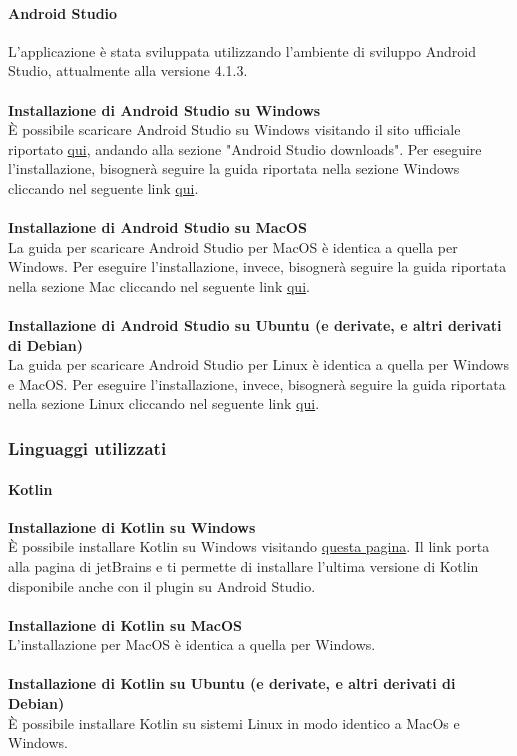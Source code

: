 \paragraph{Android Studio}
L'applicazione è stata sviluppata utilizzando l'ambiente di sviluppo Android Studio, attualmente alla versione 4.1.3.
\\
\\
\textbf{Installazione di Android Studio su Windows}
\\
È possibile scaricare Android Studio su Windows visitando il sito ufficiale riportato \href{https://developer.android.com/studio}{qui}, andando alla sezione "Android Studio downloads".
Per eseguire l'installazione, bisognerà seguire la guida riportata nella sezione Windows cliccando nel seguente link \href{https://developer.android.com/studio/install}{qui}.
\\
\\
\textbf{Installazione di Android Studio su MacOS}
\\
La guida per scaricare Android Studio per MacOS è identica a quella per Windows.
Per eseguire l'installazione, invece, bisognerà seguire la guida riportata nella sezione Mac cliccando nel seguente link \href{https://developer.android.com/studio/install}{qui}.
\\
\\
\textbf{Installazione di Android Studio su Ubuntu (e derivate, e altri derivati di Debian)}
\\
La guida per scaricare Android Studio per Linux è identica a quella per Windows e MacOS.
Per eseguire l'installazione, invece, bisognerà seguire la guida riportata nella sezione Linux cliccando nel seguente link \href{https://developer.android.com/studio/install}{qui}.
\\
\subsubsection{Linguaggi utilizzati}

\paragraph{Kotlin}
\textbf{Installazione di Kotlin su Windows}
\\
È possibile installare Kotlin su Windows visitando \href{https://plugins.jetbrains.com/plugin/6954-kotlin/versions}{questa pagina}.
Il link porta alla pagina di jetBrains e ti permette di installare l'ultima versione di Kotlin disponibile anche con il plugin su Android Studio.
\\
\\
\textbf{Installazione di Kotlin su MacOS}
\\
L'installazione per MacOS è identica a quella per Windows.
\\
\\
\textbf{Installazione di Kotlin su Ubuntu (e derivate, e altri derivati di Debian)}
\\
È possibile installare Kotlin su sistemi Linux in modo identico a MacOs e Windows.

